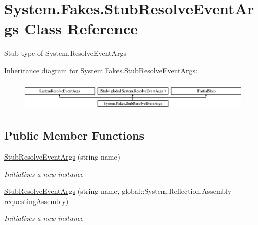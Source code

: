 \hypertarget{class_system_1_1_fakes_1_1_stub_resolve_event_args}{\section{System.\-Fakes.\-Stub\-Resolve\-Event\-Args Class Reference}
\label{class_system_1_1_fakes_1_1_stub_resolve_event_args}
}


Stub type of System.\-Resolve\-Event\-Args 


Inheritance diagram for System.\-Fakes.\-Stub\-Resolve\-Event\-Args\-:\begin{figure}[H]
\begin{center}
\leavevmode
\includegraphics[height=1.447028cm]{class_system_1_1_fakes_1_1_stub_resolve_event_args}
\end{center}
\end{figure}
\subsection*{Public Member Functions}
\begin{DoxyCompactItemize}
\item 
\hyperlink{class_system_1_1_fakes_1_1_stub_resolve_event_args_aec7a9e59ae73cb3ca958dc42c071d9f9}{Stub\-Resolve\-Event\-Args} (string name)
\begin{DoxyCompactList}\small\item\em Initializes a new instance\end{DoxyCompactList}\item 
\hyperlink{class_system_1_1_fakes_1_1_stub_resolve_event_args_a645eeee12b4b1c97a07bafeb9456827e}{Stub\-Resolve\-Event\-Args} (string name, global\-::\-System.\-Reflection.\-Assembly requesting\-Assembly)
\begin{DoxyCompactList}\small\item\em Initializes a new instance\end{DoxyCompactList}\end{DoxyCompactItemize}

